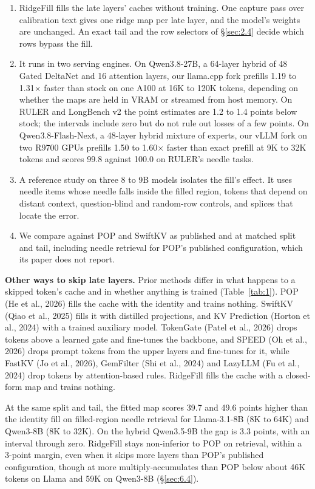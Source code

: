 \documentclass[11pt]{article}
\begin{document}
\begin{enumerate}[leftmargin=*,itemsep=2pt,topsep=4pt]
\item RidgeFill fills the late layers' caches without training. One capture pass over calibration text gives one ridge map per late layer, and the model's weights are unchanged. An exact tail and the row selectors of \S\ref{sec:2.4} decide which rows bypass the fill.
\item It runs in two serving engines. On Qwen3.8-27B, a 64-layer hybrid of 48 Gated DeltaNet and 16 attention layers, our llama.cpp fork prefills 1.19 to 1.31$\times$ faster than stock on one A100 at 16K to 120K tokens, depending on whether the maps are held in VRAM or streamed from host memory. On RULER and LongBench v2 the point estimates are 1.2 to 1.4 points below stock; the intervals include zero but do not rule out losses of a few points. On Qwen3.8-Flash-Next, a 48-layer hybrid mixture of experts, our vLLM fork on two R9700 GPUs prefills 1.50 to 1.60$\times$ faster than exact prefill at 9K to 32K tokens and scores 99.8 against 100.0 on RULER's needle tasks.
\item A reference study on three 8 to 9B models isolates the fill's effect. It uses needle items whose needle falls inside the filled region, tokens that depend on distant context, question-blind and random-row controls, and splices that locate the error.
\item We compare against POP and SwiftKV as published and at matched split and tail, including needle retrieval for POP's published configuration, which its paper does not report.
\end{enumerate}

\textbf{Other ways to skip late layers.} Prior methods differ in what happens to a skipped token's cache and in whether anything is trained (Table~\ref{tab:1}). POP (He et al., 2026) fills the cache with the identity and trains nothing. SwiftKV (Qiao et al., 2025) fills it with distilled projections, and KV Prediction (Horton et al., 2024) with a trained auxiliary model. TokenGate (Patel et al., 2026) drops tokens above a learned gate and fine-tunes the backbone, and SPEED (Oh et al., 2026) drops prompt tokens from the upper layers and fine-tunes for it, while FastKV (Jo et al., 2026), GemFilter (Shi et al., 2024) and LazyLLM (Fu et al., 2024) drop tokens by attention-based rules. RidgeFill fills the cache with a closed-form map and trains nothing.

At the same split and tail, the fitted map scores 39.7 and 49.6 points higher than the identity fill on filled-region needle retrieval for Llama-3.1-8B (8K to 64K) and Qwen3-8B (8K to 32K). On the hybrid Qwen3.5-9B the gap is 3.3 points, with an interval through zero. RidgeFill stays non-inferior to POP on retrieval, within a 3-point margin, even when it skips more layers than POP's published configuration, though at more multiply-accumulates than POP below about 46K tokens on Llama and 59K on Qwen3-8B (\S\ref{sec:6.4}).
\end{document}
